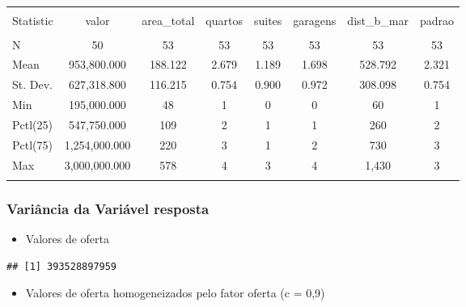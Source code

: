 \documentclass{article}
\newenvironment{Shaded}{\begin{snugshade}}{\end{snugshade}}
\newcommand{\DataTypeTok}[1]{\textcolor[rgb]{0.13,0.29,0.53}{#1}}
\newcommand{\KeywordTok}[1]{\textcolor[rgb]{0.13,0.29,0.53}{\textbf{#1}}}
\newcommand{\NormalTok}[1]{#1}
\newcommand{\OperatorTok}[1]{\textcolor[rgb]{0.81,0.36,0.00}{\textbf{#1}}}
\newcommand{\OtherTok}[1]{\textcolor[rgb]{0.56,0.35,0.01}{#1}}
\begin{document}
\begin{table}[!htbp] \centering 
  \caption{} 
  \label{} 
\begin{tabular}{@{\extracolsep{5pt}}lccccccc} 
\\[-1.8ex]\hline 
\hline \\[-1.8ex] 
Statistic & valor & area\_total & quartos & suites & garagens & dist\_b\_mar & padrao \\ 
\hline \\[-1.8ex] 
N & 50 & 53 & 53 & 53 & 53 & 53 & 53 \\ 
Mean & 953,800.000 & 188.122 & 2.679 & 1.189 & 1.698 & 528.792 & 2.321 \\ 
St. Dev. & 627,318.800 & 116.215 & 0.754 & 0.900 & 0.972 & 308.098 & 0.754 \\ 
Min & 195,000.000 & 48 & 1 & 0 & 0 & 60 & 1 \\ 
Pctl(25) & 547,750.000 & 109 & 2 & 1 & 1 & 260 & 2 \\ 
Pctl(75) & 1,254,000.000 & 220 & 3 & 1 & 2 & 730 & 3 \\ 
Max & 3,000,000.000 & 578 & 4 & 3 & 4 & 1,430 & 3 \\ 
\hline \\[-1.8ex] 
\end{tabular} 
\end{table}

\hypertarget{variuxe2ncia-da-variuxe1vel-resposta}{%
\subsubsection{Variância da Variável
resposta}\label{variuxe2ncia-da-variuxe1vel-resposta}}

\begin{itemize}
\tightlist
\item
  Valores de oferta
\end{itemize}

\begin{Shaded}
\end{Shaded}

\begin{verbatim}
## [1] 393528897959
\end{verbatim}

\begin{itemize}
\tightlist
\item
  Valores de oferta homogeneizados pelo fator oferta (c = 0,9)
\end{itemize}
\end{document}
